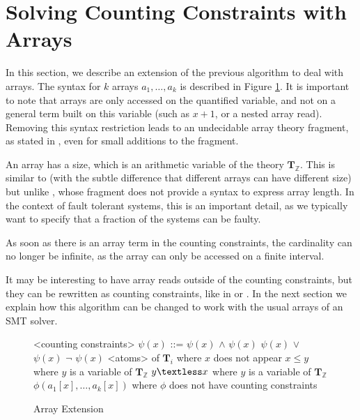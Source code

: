 \documentclass[]{article}
\begin{document}
{
\section{Solving Counting Constraints with
Arrays}\label{solving-counting-constraints-with-arrays}

In this section, we describe an extension of the previous algorithm to
deal with arrays. The syntax for $k$ arrays $a_1, \ldots, a_k$ is
described in Figure \ref{syntaxarray}. It is important to note that
arrays are only accessed on the quantified variable, and not on a
general term built on this variable (such as $x + 1$, or a nested
array read). Removing this syntax restriction leads to an undecidable
array theory fragment, as stated in
\cite{bradley2006s}, even for small additions to the
fragment.

An array has a size, which is an arithmetic variable of the theory
$\mathbf{T}_\mathbb{Z}$. This is similar to
\cite{AlbertiGP16} (with the subtle difference that
different arrays can have different size) but unlike
\cite{ConchonGKMZ12}, whose fragment does not
provide a syntax to express array length. In the context of fault
tolerant systems, this is an important detail, as we typically want to
specify that a fraction of the systems can be faulty.

As soon as there is an array term in the counting constraints, the
cardinality can no longer be infinite, as the array can only be accessed
on a finite interval.

It may be interesting to have array reads outside of the counting
constraints, but they can be rewritten as counting constraints, like in
\cite{bradley2006s} or
\cite{AlbertiGP16}. In the next section we explain
how this algorithm can be changed to work with the usual arrays of an
SMT solver.

\begin{figure}[h]
\begin{grammar}
    
<counting constraints> $\psi(x)$ ::= $\psi(x)$ $\land$ $\psi(x)$
\alt $\psi(x)$ $\lor$ $\psi(x)$
\alt $\lnot$ $\psi(x)$
\alt <atoms> of $\mathbf{T}_i$ where $x$ does not appear
\alt $x \leq y$ where $y$ is a variable of $\mathbf{T}_\mathbb{Z}$
\alt $y \textless x$ where $y$ is a variable of $\mathbf{T}_\mathbb{Z}$
\alt $\phi(a_1[x], \ldots, a_k[x])$ where $\phi$ does not have counting constraints


\end{grammar}
\caption{Array Extension}
\label{syntaxarray}
\end{figure}

}
\end{document}
